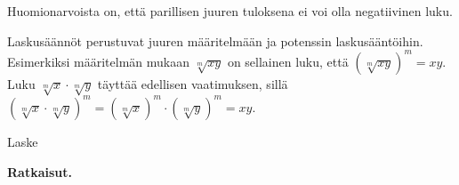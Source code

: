 Huomionarvoista on, että parillisen juuren tuloksena ei voi olla negatiivinen luku.

Laskusäännöt perustuvat juuren määritelmään ja potenssin laskusääntöihin. Esimerkiksi
määritelmän mukaan $\sqrt[m]{xy}$ on sellainen luku, että $\left( \sqrt[m]{xy} \right)^m = xy$.
Luku $\sqrt[m]{x} \cdot \sqrt[m]{y}$ täyttää edellisen vaatimuksen, sillä
$\left( \sqrt[m]{x} \cdot \sqrt[m]{y} \right)^m = \left( \sqrt[m]{x} \right)^m \cdot \left( \sqrt[m]{y} \right)^m = xy$.



\begin{esimerkki}
Laske
\begin{alakohdat}
\end{alakohdat}

{\bf Ratkaisut.}
\begin{alakohdat}
\end{alakohdat}

\end{esimerkki}



